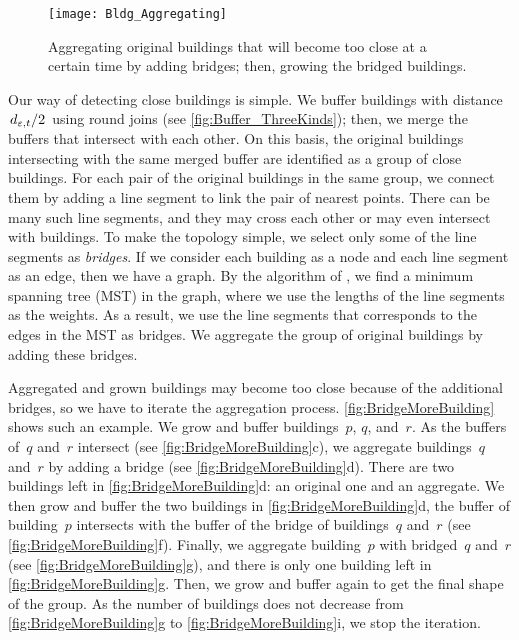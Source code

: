 \begin{figure}[tb]
\centering
\texttt{[image: Bldg\_Aggregating]}
\caption{Aggregating original buildings 
	that will become too close at a certain time 
	by adding bridges;
	then, growing the bridged buildings.}
\label{fig:GrowAndBridge}
\end{figure}

Our way of detecting close buildings is simple.
We buffer buildings with distance 
$\left. d_{\varepsilon,t}\middle/2 \right.$
using round joins
(see \fig\ref{fig:Buffer_ThreeKinds});
then, we merge the buffers that intersect with each other.
On this basis, 
the original buildings intersecting with the same merged buffer 
are identified as a group of close buildings.
For each pair of the original buildings in the same group,
we connect them by adding a line segment 
to link the pair of nearest points.
There can be many such line segments, 
and they may cross each other or may even intersect with buildings.
To make the topology simple, 
we select only some of the line segments as \emph{bridges}.  
If we consider each building as a node and 
each line segment as an edge, 
then we have a graph.
By the algorithm of \citet{Prim1957}, 
we find a minimum spanning tree (MST) in the graph,
where we use the lengths of the line segments as the weights.
As a result, we use the line segments 
that corresponds to the edges in the MST as bridges.
We aggregate the group of original buildings 
by adding these bridges.

Aggregated and grown buildings may become too close 
because of the additional bridges,
so we have to iterate the aggregation process.
\fig\ref{fig:BridgeMoreBuilding} shows such an example.
We grow and buffer buildings~$p$, $q$, and~$r$.
As the buffers of~$q$ and~$r$ intersect
(see \fig\ref{fig:BridgeMoreBuilding}c),
we aggregate buildings~$q$ and~$r$ by adding a bridge
(see \fig\ref{fig:BridgeMoreBuilding}d).
There are two buildings left in 
\fig\ref{fig:BridgeMoreBuilding}d:
an original one and an aggregate.
We then grow and buffer the two buildings in 
\fig\ref{fig:BridgeMoreBuilding}d, 
the buffer of building~$p$ intersects with
the buffer of the bridge of buildings~$q$ and~$r$
(see \fig\ref{fig:BridgeMoreBuilding}f).
Finally, we aggregate building~$p$ with bridged~$q$ and~$r$
(see \fig\ref{fig:BridgeMoreBuilding}g), 
and there is only one building left in 
\fig\ref{fig:BridgeMoreBuilding}g.
Then, we grow and buffer again 
to get the final shape of the group.
As the number of buildings 
does not decrease from \fig\ref{fig:BridgeMoreBuilding}g
to \fig\ref{fig:BridgeMoreBuilding}i,
we stop the iteration.


